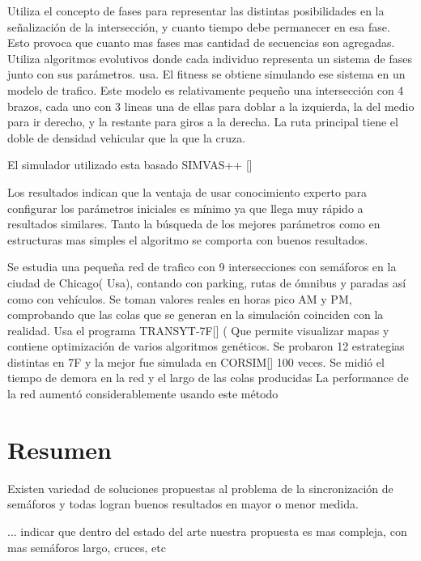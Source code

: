 \begin{itemize}
\begin{item}
Utiliza el concepto de fases para representar las distintas posibilidades en la señalización de la intersección, y cuanto tiempo debe permanecer en esa fase. Esto provoca que cuanto mas fases mas cantidad de secuencias son agregadas.
Utiliza algoritmos evolutivos donde cada individuo representa un sistema de fases junto con sus parámetros. usa. El fitness se obtiene simulando ese sistema en un modelo de trafico. Este modelo es relativamente pequeño una intersección con 4 brazos, cada uno con 3 lineas una de ellas para doblar a la izquierda, la del medio para ir derecho, y la restante para giros a la derecha. La ruta principal tiene el doble de densidad vehicular que la que la cruza.

El simulador utilizado esta basado SIMVAS++ []

Los resultados indican que la ventaja de usar conocimiento experto para configurar los parámetros iniciales es mínimo ya que llega muy rápido a resultados similares. Tanto la búsqueda de los mejores parámetros como en estructuras mas simples el algoritmo se comporta con buenos resultados.
		
	\end{item}	
	
	\begin{item}

Se estudia una pequeña red de trafico con 9 intersecciones con semáforos en la ciudad de Chicago( Usa), contando con parking, rutas de ómnibus y paradas así como con vehículos.  
Se toman valores reales en horas pico AM y PM, comprobando que las colas que se generan en la simulación coinciden con la realidad.
Usa el programa TRANSYT-7F[] ( Que permite visualizar mapas y contiene optimización de varios algoritmos genéticos.
Se probaron 12 estrategias distintas en 7F y la mejor fue simulada en CORSIM[] 100 veces. Se midió el tiempo de demora en la red y el largo de las colas producidas
La performance de la red aumentó considerablemente usando este método	
	\end{item}	

\end{itemize}


\section{Resumen}
Existen variedad de soluciones propuestas al problema de la sincronización de semáforos y todas logran buenos resultados en mayor o menor medida.

... indicar que dentro del estado del arte
nuestra propuesta es mas compleja, con mas semáforos
largo, cruces, etc